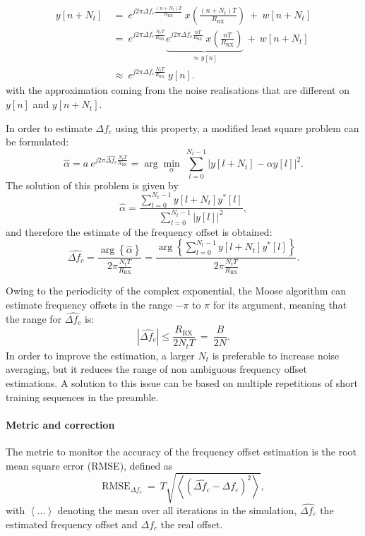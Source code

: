 \begin{align*}
    y[n+N_t] \:&=\:e^{j2\pi \Delta f_c \frac{(n+N_t)T}{R_{\text{RX}}}} \:x\left(\frac{(n+N_t)T}{R_{\text{RX}}}\right) \:+\: w[n+N_t]\\
    &=\:e^{j2\pi \Delta f_c \frac{N_tT}{R_{\text{RX}}}} \underbrace{e^{j2\pi \Delta f_c \frac{nT}{R_{\text{RX}}}}\:x\left(\frac{nT}{R_{\text{RX}}}\right)}_{\approx y[n]} \:+\: w[n+N_t]\\
    &\approx \:e^{j2\pi \Delta f_c \frac{N_tT}{R_{\text{RX}}}}\: y[n].
\end{align*}
with the approximation coming from the noise realisations that are different on $y[n]$ and $y[n+N_t]$.

In order to estimate $\Delta f_c$ using this property, a modified least square problem can be formulated:
\begin{equation*}
    \hat{\alpha} = a \:e^{j2\pi \widehat{\Delta f_c} \frac{N_tT}{R_{\text{RX}}}} = \arg\min_{\alpha} \: \sum_{l=0}^{N_t-1} \left|y[l+N_t] - \alpha y[l]\right|^2.
\end{equation*}
The solution of this problem is given by
\begin{equation*}
    \hat{\alpha} =  \frac{\sum_{l=0}^{N_t-1} y[l+N_t]y^*[l]}{\sum_{l=0}^{N_t-1} |y[l]|^2},
\end{equation*}
and therefore the estimate of the frequency offset is obtained:
\begin{equation*}
     \widehat{\Delta f_c} = \frac{\arg\left\{\hat{\alpha}\right\}}{2 \pi \frac{N_tT}{R_{\text{RX}}}} = \frac{\arg\left\{\sum_{l=0}^{N_t-1} y[l+N_t]y^*[l]\right\}}{2 \pi \frac{N_tT}{R_{\text{RX}}}}.
\end{equation*}

Owing to the periodicity of the complex exponential, the Moose algorithm can estimate frequency offsets in the range $-\pi$ to $\pi$ for its argument, meaning that the range for $\widehat{\Delta f_c}$ is:
\begin{equation*}
    |\widehat{\Delta f_c}| \leq \frac{R_{\text{RX}}}{2N_tT}\:=\:\frac{B}{2N}.
\end{equation*}
In order to improve the estimation, a larger $N_t$ is preferable to increase noise averaging, but it reduces the range of non ambiguous frequency offset estimations. A solution to this issue can be based on multiple repetitions of short training sequences in the preamble.

\paragraph{Metric and correction}
The metric to monitor the accuracy of the frequency offset estimation is the root mean square error (RMSE), defined as
\begin{equation*}
    \text{RMSE}_{\Delta f_c}\:=\:T\sqrt{\left\langle\left(\widehat{\Delta f_c}-\Delta f_c\right)^2\right\rangle},
\end{equation*}
with $\left\langle ... \right\rangle$ denoting the mean over all iterations in the simulation, $\widehat{\Delta f_c}$ the estimated frequency offset and $\Delta f_c$ the real offset.

